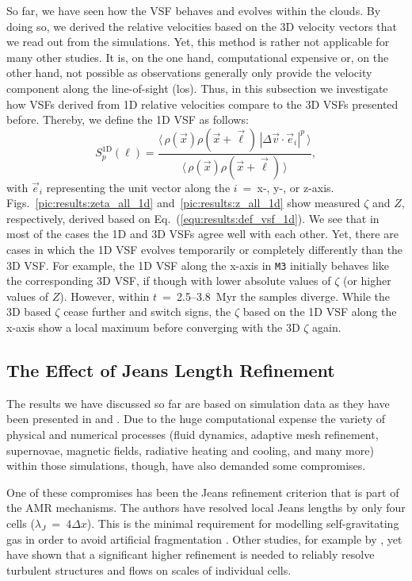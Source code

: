 So far, we have seen how the VSF behaves and evolves within the clouds.
By doing so, we derived the relative velocities based on the 3D velocity vectors that we read out from the simulations.
Yet, this method is rather not applicable for many other studies. 
It is, on the one hand, computational expensive or, on the other hand, not possible as observations generally only provide the velocity component along the line-of-sight (los).
Thus, in this subsection we investigate how VSFs derived from 1D relative velocities compare to the 3D VSFs presented before.
Thereby, we define the 1D VSF as follows:
\begin{equation}
	\mathit{S}_p^\mathrm{1D} (\ell) = \frac{\langle \, \rho(\vec{x}) \rho(\vec{x}+\vec{\ell}) \, |\Delta \vec{v} \cdot \vec{e}_i|^p  \, \rangle}{\langle  \, \rho(\vec{x}) \rho(\vec{x}+\vec{\ell}) \, \rangle} ,
    \label{equ:results:def_vsf_1d}
\end{equation}
with $\vec{e}_i$ representing the unit vector along the $i$~=~x-, y-, or z-axis.
Figs.~\ref{pic:results:zeta_all_1d} and~\ref{pic:results:z_all_1d} show measured $\zeta$ and $Z$, respectively, derived based on Eq.~(\ref{equ:results:def_vsf_1d}). 
We see that in most of the cases the 1D and 3D VSFs agree well with each other.
Yet, there are cases in which the 1D VSF evolves temporarily or completely differently than the 3D VSF.
For example, the 1D VSF along the x-axis in \texttt{M3} initially behaves like the corresponding 3D VSF, if though with lower absolute values of $\zeta$ (or higher values of $Z$).
However, within $t$~=~2.5--3.8~Myr the samples diverge. 
While the 3D based $\zeta$ cease further and switch signs, the $\zeta$ based on the 1D VSF along the x-axis show a local maximum before converging with the 3D $\zeta$ again. 


\subsection{The Effect of Jeans Length Refinement}\label{results:refinement}

The results we have discussed so far are based on simulation data as they have been presented in  and .
Due to the huge computational expense the variety of physical and numerical processes (fluid dynamics, adaptive mesh refinement, supernovae, magnetic fields, radiative heating and cooling, and many more) within those simulations, though, have also demanded some compromises.

One of these compromises has been the Jeans refinement criterion that is part of the AMR mechanisms.
The authors have resolved local Jeans lengths by only four cells ($\lambda_J$~=~$4\Delta{}x$).
This is the minimal requirement for modelling self-gravitating gas in order to avoid artificial fragmentation \citep{Truelove1998}. 
Other studies, for example by \citet{Turk2012}, yet have shown that a significant higher refinement is needed to reliably resolve turbulent structures and flows on scales of individual cells.

